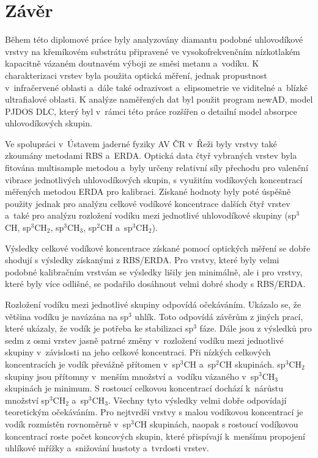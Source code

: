 \chapter*{Závěr}

Během této diplomové práce byly analyzovány diamantu podobné uhlovodíkové vrstvy na křemíkovém substrátu připravené ve vysokofrekvenčním nízkotlakém kapacitně vázaném doutnavém výboji ze směsi metanu a~vodíku. K charakterizaci vrstev byla použita optická měření, jednak propustnost v~infračervené oblasti a~dále také odrazivost a~elipsometrie ve viditelné a~blízké ultrafialové oblasti. K analýze naměřených dat byl použit program newAD, model PJDOS DLC, který byl v~rámci této práce rozšířen o detailní model absorpce uhlovodíkových skupin. 

Ve spolupráci v~Ústavem jaderné fyziky AV ČR v~Řeži byly vrstvy také zkoumány metodami RBS a~ERDA. Optická data čtyř vybraných vrstev byla fitována multisample metodou a~byly určeny relativní síly přechodu pro valenční vibrace jednotlivých uhlovodíkových skupin, s využitím vodíkových koncentrací měřených metodou ERDA pro kalibraci. Získané hodnoty byly poté úspěšně použity jednak pro analýzu celkové vodíkové koncentrace dalších čtyř vrstev a~také pro analýzu rozložení vodíku mezi jednotlivé uhlovodíkové skupiny (sp$^3$CH, sp$^3$CH$_2$, sp$^3$CH$_3$, sp$^2$CH a~sp$^3$CH$_2$). 

Výsledky celkové vodíkové koncentrace získané pomocí optických měření se dobře shodují s výsledky získanými z RBS/ERDA. Pro vrstvy, které byly velmi podobné kalibračním vrstvám se výsledky lišily jen minimálně, ale i pro vrstvy, které byly více odlišné, se podařilo dosáhnout velmi dobré shody s RBS/ERDA.

Rozložení vodíku mezi jednotlivé skupiny odpovídá očekáváním. Ukázalo se, že většina vodíku je navázána na sp$^3$ uhlík. Toto odpovídá závěrům z jiných prací, které ukázaly, že vodík je potřeba ke stabilizaci sp$^3$ fáze. Dále jsou z výsledků pro sedm z osmi vrstev jasně patrné změny v~rozložení vodíku mezi jednotlivé skupiny v~závislosti na jeho celkové koncentraci. 
Při nízkých celkových koncentracích je vodík převážně přítomen v~sp$^3$CH a~sp$^2$CH skupinách. sp$^3$CH$_2$ skupiny jsou přítomny v~menším množství a~vodíku vázaného v~sp$^3$CH$_3$ skupinách je minimum. S rostoucí celkovou koncentrací dochází k~nárůstu množství sp$^3$CH$_2$ a~sp$^3$CH$_3$. 
Všechny tyto výsledky velmi dobře odpovídají teoretickým očekáváním. Pro nej\-tvrdší vrstvy s malou vodíkovou koncentrací je vodík rozmístěn rovnoměrně v~sp$^3$CH skupinách, naopak s rostoucí vodíkovou koncentrací roste počet koncových skupin, které přispívají k~menšímu propojení uhlíkové mřížky a~snižování hustoty a~tvrdosti vrstev.

